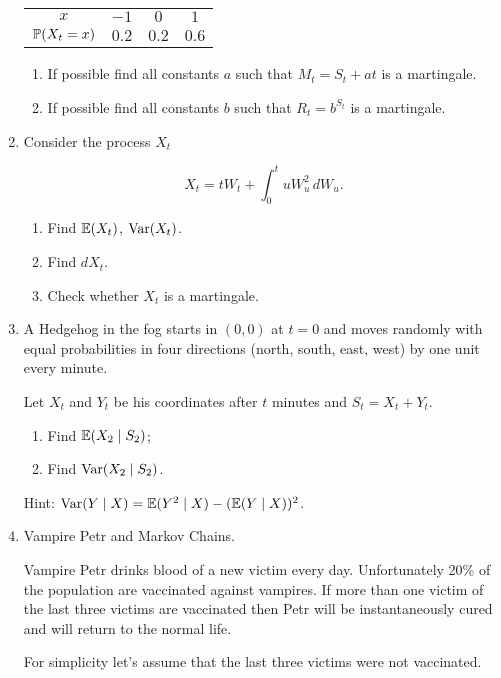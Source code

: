\begin{enumerate}
\begin{tabular}{cccc}
\toprule
$x$ & $-1$ & $0$ & $1$ \\
$\P(X_t = x)$ & $0.2$ & $0.2$ & $0.6$ \\
\bottomrule
\end{tabular}

\begin{enumerate}
    \item If possible find all constants $a$ such that $M_t = S_t + at$ is a martingale.
  \item If possible find all constants $b$ such that $R_t = b^{S_t}$ is a martingale.
\end{enumerate}

\item Consider the process $X_t$

\[
X_t= tW_t + \int_0^t uW_u^2\, dW_u.
\]

\begin{enumerate}
    \item Find $\E(X_t)$, $\Var(X_t)$.
    \item Find $dX_t$.
    \item Check whether $X_t$ is a martingale.
\end{enumerate}

\item A Hedgehog in the fog starts in $(0, 0)$ at $t=0$ and moves randomly with equal probabilities in four directions (north, south, east, west) by one unit every minute. 

Let $X_t$ and $Y_t$ be his coordinates after $t$ minutes and $S_t = X_t + Y_t$.

\begin{enumerate}
    \item Find $\E(X_2 \mid S_2)$;
    \item Find $\Var(X_2 \mid S_2)$.
\end{enumerate}

Hint: $\Var(Y \mid X) = \E(Y^2 \mid X) - (\E(Y \mid X))^2$.

    \item Vampire Petr and Markov Chains. 
    
    Vampire Petr drinks blood of a new victim every day. 
    Unfortunately 20\% of the population are vaccinated against vampires. 
    If more than one victim of the last three victims are vaccinated then Petr will be instantaneously cured and will return to the normal life. 
 
    For simplicity let's assume that the last three victims were not vaccinated. 
    

\end{enumerate}
